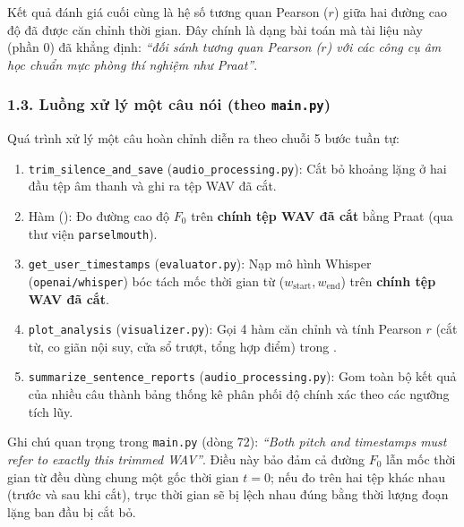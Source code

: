\documentclass[11pt,a4paper]{article}
\begin{document}
Kết quả đánh giá cuối cùng là hệ số tương quan Pearson ($r$) giữa hai đường cao độ đã được căn chỉnh thời gian. Đây chính là dạng bài toán mà tài liệu này (phần 0) đã khẳng định: \textit{``đối sánh tương quan Pearson ($r$) với các công cụ âm học chuẩn mực phòng thí nghiệm như Praat''}.

\subsubsection*{1.3. Luồng xử lý một câu nói (theo \texttt{main.py})}
Quá trình xử lý một câu hoàn chỉnh diễn ra theo chuỗi 5 bước tuần tự:
\begin{enumerate}
    \setlength{\itemsep}{1.5pt}
    \item \texttt{trim\_silence\_and\_save} (\texttt{audio\_processing.py}): Cắt bỏ khoảng lặng ở hai đầu tệp âm thanh và ghi ra tệp WAV đã cắt.
    \item Hàm  (): Đo đường cao độ $F_0$ trên \textbf{chính tệp WAV đã cắt} bằng Praat (qua thư viện \texttt{parselmouth}).
    \item \texttt{get\_user\_timestamps} (\texttt{evaluator.py}): Nạp mô hình Whisper (\texttt{openai/whisper}) bóc tách mốc thời gian từ ($w_{\text{start}}, w_{\text{end}}$) trên \textbf{chính tệp WAV đã cắt}.
    \item \texttt{plot\_analysis} (\texttt{visualizer.py}): Gọi 4 hàm căn chỉnh và tính Pearson $r$ (cắt từ, co giãn nội suy, cửa sổ trượt, tổng hợp điểm) trong .
    \item \texttt{summarize\_sentence\_reports} (\texttt{audio\_processing.py}): Gom toàn bộ kết quả của nhiều câu thành bảng thống kê phân phối độ chính xác theo các ngưỡng tích lũy.
\end{enumerate}

Ghi chú quan trọng trong \texttt{main.py} (dòng 72): \textit{``Both pitch and timestamps must refer to exactly this trimmed WAV''}. Điều này bảo đảm cả đường $F_0$ lẫn mốc thời gian từ đều dùng chung một gốc thời gian $t = 0$; nếu đo trên hai tệp khác nhau (trước và sau khi cắt), trục thời gian sẽ bị lệch nhau đúng bằng thời lượng đoạn lặng ban đầu bị cắt bỏ.
\end{document}

